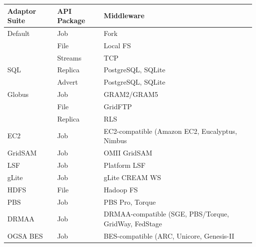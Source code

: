 \begin{center}
    \begin{tabular}{llp{6.4cm}}
    \hline
    Adaptor Suite & API Package & Middleware \\ \hline
      
    Default & Job  & Fork       \\
            & File & Local FS       \\ 
            & Streams & TCP       \\\hline

    SQL & Replica  & PostgreSQL, SQLite           \\
        & Advert  & PostgreSQL, SQLite       \\\hline

    Globus & Job  & GRAM2/GRAM5          \\
           & File  & GridFTP      \\
           & Replica  & RLS       \\\hline

    EC2    & Job  & EC2-compatible (Amazon EC2, Eucalyptus, Nimbus           \\\hline

    GridSAM & Job  & OMII GridSAM           \\\hline

    LSF & Job  & Platform LSF           \\\hline

    gLite & Job  & gLite CREAM WS           \\\hline

    HDFS & File  & Hadoop FS           \\\hline

    PBS & Job  & PBS Pro, Torque           \\\hline

    DRMAA & Job  & DRMAA-compatible (SGE, PBS/Torque, GridWay, FedStage  \\\hline
    
    OGSA BES & Job  & BES-compatible (ARC, Unicore, Genesis-II  \\\hline


    \hline
    \end{tabular}
\end{center}
 
 \begin{center}
 
 \begin{tabular}{clcc}
 
 \end{tabular}
 
 \end{center}
 
